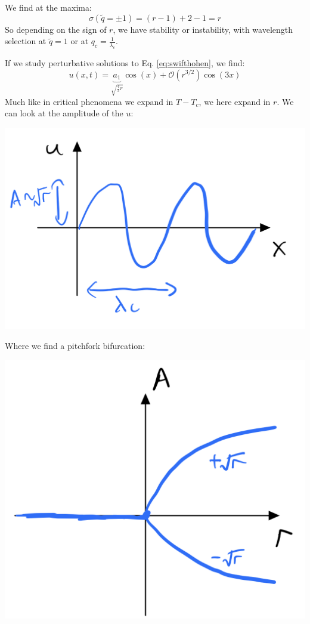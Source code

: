 We find at the maxima:
\begin{equation}
    \sigma(\tilde{q} = \pm 1) = (r - 1) + 2 - 1 = r
\end{equation}
So depending on the sign of $r$, we have stability or instability, with wavelength selection at $\tilde{q} = 1$ or at $q_c = \frac{1}{\lambda_c}$.

If we study perturbative solutions to Eq. \eqref{eq:swifthohen}, we find:
\begin{equation}
    u(x, t) = \underbrace{a_1}_{\sqrt{\frac{4}{3}r}}\cos(x) + \mathcal{O}(r^{3/2})\cos(3x)
\end{equation}
Much like in critical phenomena we expand in $T - T_c$, we here expand in $r$. We can look at the amplitude of the $u$:

\begin{center}
    \includegraphics[scale=0.35]{Lectures/Images/lec18-ux.png}
\end{center}

Where we find a pitchfork bifurcation:

\begin{center}
    \includegraphics[scale=0.35]{Lectures/Images/lec18-Abifurcation.png}
\end{center}

